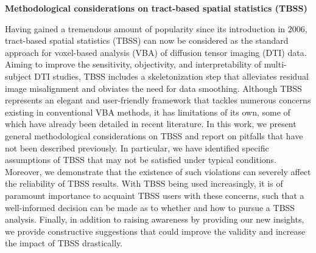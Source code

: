 \documentclass{article}
\begin{document}
\textbf{Methodological considerations on tract-based spatial statistics (TBSS)}

\hfill

Having gained a tremendous amount of popularity since its introduction in 2006, tract-based spatial 
statistics (TBSS) can now be considered as the standard approach for voxel-based analysis (VBA) of 
diffusion tensor imaging (DTI) data. Aiming to improve the sensitivity, objectivity, and interpretability 
of multi-subject DTI studies, TBSS includes a skeletonization step that alleviates residual image 
misalignment and obviates the need for data smoothing. Although TBSS represents an elegant and 
user-friendly framework that tackles numerous concerns existing in conventional VBA methods, it has 
limitations of its own, some of which have already been detailed in recent literature. In this work, we 
present general methodological considerations on TBSS and report on pitfalls that have not been described 
previously. In particular, we have identiﬁed speciﬁc assumptions of TBSS that may not be satisﬁed under 
typical conditions. Moreover, we demonstrate that the existence of such violations can severely affect the 
reliability of TBSS results. With TBSS being used increasingly, it is of paramount importance to acquaint 
TBSS users with these concerns, such that a well-informed decision can be made as to whether and how to 
pursue a TBSS analysis. Finally, in addition to raising awareness by providing our new insights, we provide 
constructive suggestions that could improve the validity and increase the impact of TBSS drastically.

{\color{blue} }


 
\end{document}
